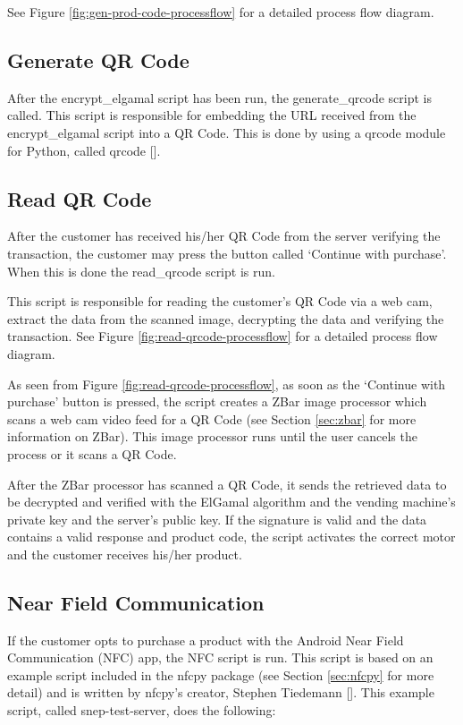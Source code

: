 See Figure \ref{fig:gen-prod-code-processflow} for a detailed process flow
diagram.

\subsection{Generate QR Code}
\label{sec:gen-qrcode}

After the encrypt\_elgamal script has been run, the generate\_qrcode script is
called. This script is responsible for embedding the URL received from the
encrypt\_elgamal script into a QR Code. This is done by using a qrcode module
for Python, called qrcode [\cite{website:qrcode-generator}].

\subsection{Read QR Code}

After the customer has received his/her QR Code from the server verifying the
transaction, the customer may press the button called `Continue with purchase'.
When this is done the read\_qrcode script is run.

This script is responsible for reading the customer's QR Code via a web cam,
extract the data from the scanned image, decrypting the data and verifying the
transaction. See Figure \ref{fig:read-qrcode-processflow} for a detailed process
flow diagram. 

As seen from Figure \ref{fig:read-qrcode-processflow}, as soon as the `Continue
with purchase' button is pressed, the script creates a ZBar image processor
which scans a web cam video feed for a QR Code (see Section \ref{sec:zbar} for
more information on ZBar). This image processor runs until the user cancels the
process or it scans a QR Code. 

After the ZBar processor has scanned a QR Code, it sends the retrieved data to
be decrypted and verified with the ElGamal algorithm and the vending machine's
private key and the server's public key. If the signature is valid and the data
contains a valid response and product code, the script activates the correct
motor and the customer receives his/her product. 

\subsection{Near Field Communication}

If the customer opts to purchase a product with the Android Near Field
Communication (NFC) app, the NFC script is run. This script is based on an
example script included in the nfcpy package (see Section \ref{sec:nfcpy} for
more detail) and is written by nfcpy's creator, Stephen Tiedemann
[\cite{website:nfcpy}]. This example script, called snep-test-server, does the
following:

